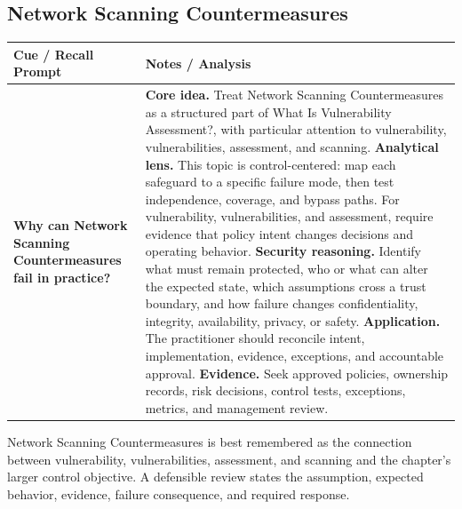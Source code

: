 \documentclass[11pt]{article}
\newcommand{\CornellHeader}{%
\rowcolor{Navy}\color{white}\bfseries Cue / Recall Prompt & \color{white}\bfseries Notes / Analysis\\\hline}
\newcommand{\CornellRow}[2]{%
\cellcolor{CueGray}\RaggedRight\textbf{#1} & \RaggedRight #2\\\hline}
\begin{document}
\subsection*{Network Scanning Countermeasures}
\begin{longtable}{>{\RaggedRight\arraybackslash}p{}|>{\RaggedRight\arraybackslash}p{}}
\CornellHeader
\CornellRow{Why can Network Scanning Countermeasures fail in practice?}{\textbf{Core idea.} Treat Network Scanning Countermeasures as a structured part of What Is Vulnerability Assessment?, with particular attention to vulnerability, vulnerabilities, assessment, and scanning. \textbf{Analytical lens.} This topic is control-centered: map each safeguard to a specific failure mode, then test independence, coverage, and bypass paths. For vulnerability, vulnerabilities, and assessment, require evidence that policy intent changes decisions and operating behavior. \textbf{Security reasoning.} Identify what must remain protected, who or what can alter the expected state, which assumptions cross a trust boundary, and how failure changes confidentiality, integrity, availability, privacy, or safety. \textbf{Application.} The practitioner should reconcile intent, implementation, evidence, exceptions, and accountable approval. \textbf{Evidence.} Seek approved policies, ownership records, risk decisions, control tests, exceptions, metrics, and management review.}
\end{longtable}
\begin{topicsummary}
Network Scanning Countermeasures is best remembered as the connection between vulnerability, vulnerabilities, assessment, and scanning and the chapter's larger control objective. A defensible review states the assumption, expected behavior, evidence, failure consequence, and required response.
\end{topicsummary}
\end{document}
